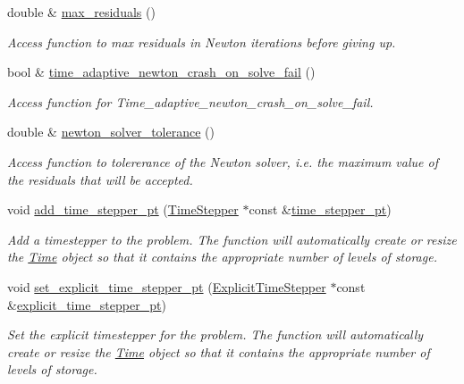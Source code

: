\begin{DoxyCompactItemize}
double \& \hyperlink{classoomph_1_1Problem_a2ad78241135f621df36bc1b9634845ac}{max\+\_\+residuals} ()
\begin{DoxyCompactList}\small\item\em Access function to max residuals in Newton iterations before giving up. \end{DoxyCompactList}\item 
bool \& \hyperlink{classoomph_1_1Problem_a7a42b89a67e0770c68493b9569bffe16}{time\+\_\+adaptive\+\_\+newton\+\_\+crash\+\_\+on\+\_\+solve\+\_\+fail} ()
\begin{DoxyCompactList}\small\item\em Access function for Time\+\_\+adaptive\+\_\+newton\+\_\+crash\+\_\+on\+\_\+solve\+\_\+fail. \end{DoxyCompactList}\item 
double \& \hyperlink{classoomph_1_1Problem_aa43a98d2303f2bce10d0887dc0b2eac5}{newton\+\_\+solver\+\_\+tolerance} ()
\begin{DoxyCompactList}\small\item\em Access function to tolererance of the Newton solver, i.\+e. the maximum value of the residuals that will be accepted. \end{DoxyCompactList}\item 
void \hyperlink{classoomph_1_1Problem_a8856eae2daa9cea05e99bfcd4ef340a4}{add\+\_\+time\+\_\+stepper\+\_\+pt} (\hyperlink{classoomph_1_1TimeStepper}{Time\+Stepper} $\ast$const \&\hyperlink{classoomph_1_1Problem_acfdb74e8522fa5d486064998e7223fc6}{time\+\_\+stepper\+\_\+pt})
\begin{DoxyCompactList}\small\item\em Add a timestepper to the problem. The function will automatically create or resize the \hyperlink{classoomph_1_1Time}{Time} object so that it contains the appropriate number of levels of storage. \end{DoxyCompactList}\item 
void \hyperlink{classoomph_1_1Problem_a4cf44478e6f6abe95063b7bb2dd530a0}{set\+\_\+explicit\+\_\+time\+\_\+stepper\+\_\+pt} (\hyperlink{classoomph_1_1ExplicitTimeStepper}{Explicit\+Time\+Stepper} $\ast$const \&\hyperlink{classoomph_1_1Problem_a6e1f71717b7541246f8bea79dc5ba943}{explicit\+\_\+time\+\_\+stepper\+\_\+pt})
\begin{DoxyCompactList}\small\item\em Set the explicit timestepper for the problem. The function will automatically create or resize the \hyperlink{classoomph_1_1Time}{Time} object so that it contains the appropriate number of levels of storage. \end{DoxyCompactList}\item 

\end{DoxyCompactItemize}
